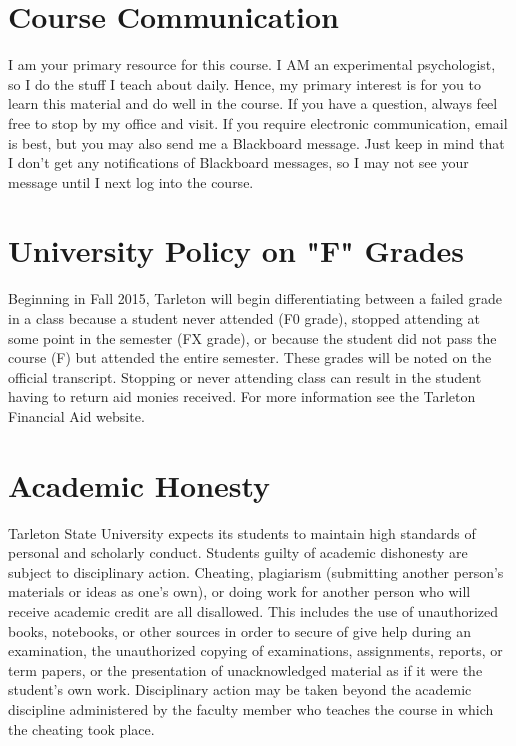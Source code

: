 \documentclass[10pt]{article}
\begin{document}
\section*{Course Communication}
\label{sec-6}

I am your primary resource for this course. I AM an experimental psychologist, so I do the stuff I teach about daily. Hence, my primary interest is for you to learn this material and do well in the course. If you have a question, always feel free to stop by my office and visit.  If you require electronic communication, email is best, but you may also send me a Blackboard message.  Just keep in mind that I don't get any notifications of Blackboard messages, so I may not see your message until I next log into the course.

\section*{University Policy on "F" Grades}
\label{sec-7}

Beginning in Fall 2015, Tarleton will begin differentiating between a failed grade in a class because a student never attended (F0 grade), stopped attending at some point in the semester (FX grade), or because the student did not pass the course (F) but attended the entire semester. These grades will be noted on the official transcript. Stopping or never attending class can result in the student having to return aid monies received.  For more information see the Tarleton Financial Aid website.

\section*{Academic Honesty}
\label{sec-8}

Tarleton State University expects its students to maintain high standards of
personal and scholarly conduct. Students guilty of academic dishonesty are
subject to disciplinary action. Cheating, plagiarism (submitting another person’s materials or ideas as one’s own), or doing work for another person who will receive academic credit are all disallowed. This includes the use of unauthorized books, notebooks, or other sources in order to secure of give help during an examination, the unauthorized copying of examinations, assignments, reports, or term papers, or the presentation of unacknowledged material as if it were the student’s own work. Disciplinary action may be taken beyond the academic discipline administered by the faculty member who teaches the course in which the cheating took place.
\end{document}
